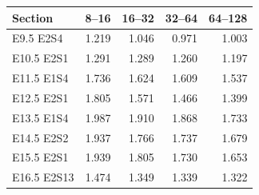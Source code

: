 \begin{tabular}{lrrrr}
\toprule
Section & 8–16 & 16–32 & 32–64 & 64–128 \\
\midrule
E9.5 E2S4 & 1.219 & 1.046 & 0.971 & 1.003 \\
E10.5 E2S1 & 1.291 & 1.289 & 1.260 & 1.197 \\
E11.5 E1S4 & 1.736 & 1.624 & 1.609 & 1.537 \\
E12.5 E2S1 & 1.805 & 1.571 & 1.466 & 1.399 \\
E13.5 E1S4 & 1.987 & 1.910 & 1.868 & 1.733 \\
E14.5 E2S2 & 1.937 & 1.766 & 1.737 & 1.679 \\
E15.5 E2S1 & 1.939 & 1.805 & 1.730 & 1.653 \\
E16.5 E2S13 & 1.474 & 1.349 & 1.339 & 1.322 \\
\bottomrule
\end{tabular}
